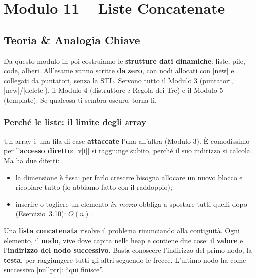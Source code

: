 \chapter{Modulo 11 -- Liste Concatenate}


\section{Teoria \& Analogia Chiave}

Da questo modulo in poi costruiamo le \textbf{strutture dati dinamiche}: liste,
pile, code, alberi. All'esame vanno scritte \textbf{da zero}, con nodi allocati con
\cc|new| e collegati da puntatori, senza la STL. Servono tutto il Modulo 3
(puntatori, \cc|new|/\cc|delete|), il Modulo 4 (distruttore e Regola dei Tre) e il
Modulo 5 (template). Se qualcosa ti sembra oscuro, torna lì.

\subsection*{Perché le liste: il limite degli array}

Un array è una fila di case \textbf{attaccate} l'una all'altra (Modulo 3). È
comodissimo per l'\textbf{accesso diretto}: \cc|v[i]| si raggiunge subito, perché il
suo indirizzo si calcola. Ma ha due difetti:
\begin{itemize}
  \item la dimensione è fissa: per farlo crescere bisogna allocare un nuovo blocco e
        ricopiare tutto (lo abbiamo fatto con il raddoppio);
  \item inserire o togliere un elemento \emph{in mezzo} obbliga a spostare tutti quelli
        dopo (Esercizio~3.10): $O(n)$.
\end{itemize}

Una \textbf{lista concatenata} risolve il problema rinunciando alla contiguità. Ogni
elemento, il \textbf{nodo}, vive dove capita nello heap e contiene due cose: il
\textbf{valore} e l'\textbf{indirizzo del nodo successivo}. Basta conoscere
l'indirizzo del primo nodo, la \textbf{testa}, per raggiungere tutti gli altri
seguendo le frecce. L'ultimo nodo ha come successivo \cc|nullptr|: ``qui finisce''.

